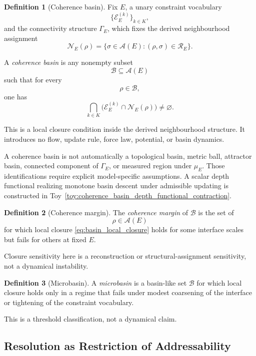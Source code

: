 \documentclass[aps,prx,onecolumn,11pt]{revtex4-2}
\theoremstyle{plain}
\theoremstyle{definition}
\newtheorem{definition}{Definition}
\theoremstyle{remark}
\begin{document}
\begin{definition}[Coherence basin]
\label{def:coherence_basin_struct}
Fix \(E\), a unary constraint vocabulary
\[
\{\mathcal{E}^{(k)}_E\}_{k\in K},
\]
and the connectivity structure \(\Gamma_E\), which fixes the derived
neighbourhood assignment
\[
\mathcal N_E(\rho)=\{\sigma\in\mathcal A(E):(\rho,\sigma)\in\mathcal R_E\}.
\]

A \emph{coherence basin} is any nonempty subset
\[
\mathcal{B}\subseteq\mathcal{A}(E)
\]
such that for every
\[
\rho\in\mathcal{B},
\]
one has
\begin{equation}
\bigcap_{k\in K}
\bigl(
\mathcal{E}^{(k)}_E
\cap
\mathcal{N}_E(\rho)
\bigr)
\neq
\varnothing.
\label{eq:basin_local_closure}
\end{equation}

This is a local closure condition inside the derived neighbourhood
structure. It introduces no flow, update rule, force law, potential, or
basin dynamics.
\end{definition}

A coherence basin is not automatically a topological basin, metric
ball, attractor basin, connected component of \(\Gamma_E\), or measured
region under \(\mu_E\). Those identifications require explicit
model-specific assumptions. A scalar depth functional realizing
monotone basin descent under admissible updating is constructed in
Toy~\ref{toy:coherence_basin_depth_functional_contraction}.

\begin{definition}[Coherence margin]
\label{def:coherence_margin_struct}
The \emph{coherence margin} of \(\mathcal{B}\) is the set of
\[
\rho\in\mathcal{A}(E)
\]
for which local closure
\eqref{eq:basin_local_closure} holds for some interface scales but fails
for others at fixed \(E\).

Closure sensitivity here is a reconstruction or structural-assignment
sensitivity, not a dynamical instability.
\end{definition}

\begin{definition}[Microbasin]
\label{def:microbasin_struct}
A \emph{microbasin} is a basin-like set \(\mathcal{B}\) for which local
closure holds only in a regime that fails under modest coarsening of the
interface or tightening of the constraint vocabulary.

This is a threshold classification, not a dynamical claim.
\end{definition}

\subsection{Resolution as Restriction of Addressability}
\label{subsec:resolution_as_restriction}
\end{document}
